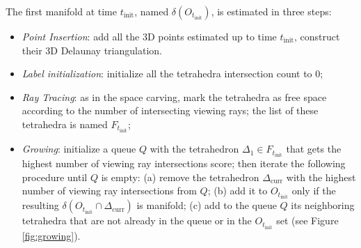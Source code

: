 The first manifold at time $t_{\text{init}}$,  named $\delta( O_{t_{\text{init}}})$, is estimated in three steps:
\begin{itemize}
  \item \emph{Point Insertion}: add all the 3D points estimated up to time $t_{\text{init}}$, construct their 3D Delaunay triangulation.
  \item \emph{Label initialization}: initialize all the tetrahedra intersection count to $0$;
  \item \emph{Ray Tracing}: as in the space carving, mark the tetrahedra as free space according to the number of intersecting viewing rays; the list of these tetrahedra is named $F_{t_{\text{init}}}$;
  \item \emph{Growing}: initialize a queue $Q$ with the tetrahedron $\Delta_1 \in F_{t_{\text{init}}}$ that gets the highest number of viewing ray intersections score; then iterate the following procedure until $Q$ is empty: (a) remove the tetrahedron $\Delta_{\text{curr}}$ with the highest number of viewing ray intersections from $Q$; (b) add it to $O_{t_{\text{init}}}$ only if the resulting $\delta (O_{t_{\text{init}}} \cap \Delta_{\text{curr}})$  is manifold; (c) add to the queue $Q$ its neighboring tetrahedra that are not already in the queue or in the $O_{t_{\text{init}}}$ set (see Figure \ref{fig:growing}). 
\end{itemize}


